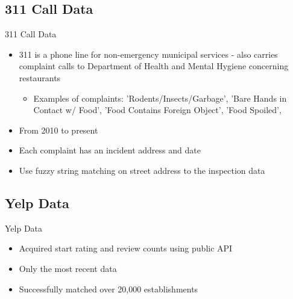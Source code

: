 \documentclass[handout]{beamer}
\begin{document}
\subsection{311 Call Data}
\begin{frame}{311 Call Data}
\begin{itemize}
\item 311 is a phone line for non-emergency municipal services - also carries complaint calls to Department of Health and Mental Hygiene concerning restaurants
\begin{itemize}
\item Examples of complaints: 'Rodents/Insects/Garbage', 'Bare Hands in Contact w/ Food', 'Food Contains Foreign Object', 'Food Spoiled', 
\end{itemize}
\item From 2010 to present
\item Each complaint has an incident address and date
\item Use fuzzy string matching on street address to the inspection data
\end{itemize}
\end{frame}

\subsection{Yelp Data}
\begin{frame}{Yelp Data}
\begin{itemize}
\item Acquired start rating and review counts using public API
\item Only the most recent data
\item Successfully matched over 20,000 establishments
\end{itemize}
\end{frame}
\end{document}
